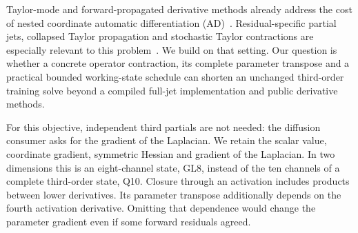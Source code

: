 \documentclass[11pt]{article}
\begin{document}
Taylor-mode and forward-propagated derivative methods already address the
cost of nested coordinate automatic differentiation
(AD)~\cite{griewank,taylorjax,fwdlap}. Residual-specific partial jets,
collapsed Taylor propagation and stochastic Taylor contractions are
especially relevant to this problem~\cite{cao,cmtad,stdepp}. We build on
that setting. Our question is whether a concrete operator contraction, its
complete parameter transpose and a practical bounded working-state schedule
can shorten an unchanged third-order training solve beyond a compiled
full-jet implementation and public derivative methods.

For this objective, independent third partials are not needed: the diffusion
consumer asks for the gradient of the Laplacian. We retain the scalar value,
coordinate gradient, symmetric Hessian and gradient of the Laplacian. In two
dimensions this is an eight-channel state, GL8, instead of the ten channels
of a complete third-order state, Q10. Closure through an activation includes
products between lower derivatives. Its parameter transpose additionally
depends on the fourth activation derivative. Omitting that dependence would
change the parameter gradient even if some forward residuals agreed.
\end{document}
